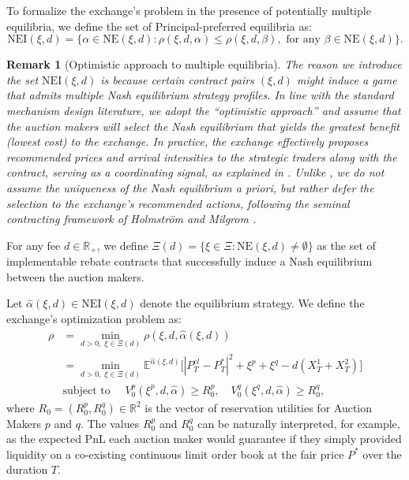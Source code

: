 \documentclass[12pt]{article}
\newtheorem{remark}[theorem2]{Remark}
\begin{document}
To formalize the exchange's problem in the presence of potentially multiple equilibria, we define the set of Principal-preferred equilibria as:
\[ \text{NEI}(\xi,d) = \big\{ \alpha \in \text{NE}(\xi,d) : \rho(\xi,d,\alpha) \leq \rho(\xi,d,\beta), \text{ for any } \beta \in \text{NE}(\xi,d) \big\}. \]

\begin{remark}[Optimistic approach to multiple equilibria]
The reason we introduce the set $\text{NEI}(\xi,d)$ is because certain contract pairs $(\xi,d)$ might induce a game that admits multiple Nash equilibrium strategy profiles. In line with the standard mechanism design literature, we adopt the ``optimistic approach'' and assume that the auction makers will select the Nash equilibrium that yields the greatest benefit (lowest cost) to the exchange. In practice, the exchange effectively proposes recommended prices and arrival intensities to the strategic traders along with the contract, serving as a coordinating signal, as explained in \cite{elie2019contracting}. Unlike \cite[Assumption 3.1]{hernandez2024principal}, we do not assume the uniqueness of the Nash equilibrium a priori, but rather defer the selection to the exchange's recommended actions, following the seminal contracting framework of Holmström and Milgrom \cite{holmstrom1987aggregation}.
\end{remark}


For any fee $d \in \mathbb{R}_+$, we define $\Xi(d) = \{ \xi \in \Xi : \text{NE}(\xi,d) \neq \emptyset \}$ as the set of implementable rebate contracts that successfully induce a Nash equilibrium between the auction makers. 

Let $\hat{\alpha}(\xi,d) \in \text{NEI}(\xi,d)$ denote the equilibrium strategy. We define the exchange's  optimization problem as:
\begin{align}
    \rho &= \min_{d>0, \; \xi \in \Xi(d)} \rho(\xi, d, \hat{\alpha}(\xi,d)) \nonumber \\
    &= \min_{d > 0, \; \xi \in \Xi(d)} \mathbb{E}^{\hat{\alpha}(\xi,d)}\Big[ |P^{cl}_T - P_T^{*}|^2 + \xi^p + \xi^q - d(X^1_T + X^2_T) \Big] \label{eq:ex} \\
    &\text{subject to } \quad V_0^{p}(\xi^p,d,\hat{\alpha}) \geq R_0^p, \quad V_0^{q}(\xi^q,d,\hat{\alpha}) \geq R_0^q, \label{eq:ex_const}
\end{align}
where $R_0 = (R_0^p, R_0^q) \in \mathbb{R}^2$ is the vector of reservation utilities for Auction Makers $p$ and $q$. The values $R_0^p$ and $R_0^q$ can be naturally interpreted, for example, as the expected PnL each auction maker would guarantee if they simply provided liquidity on a co-existing continuous limit order book at the fair price $P^*$ over the duration $T$.
\end{document}
